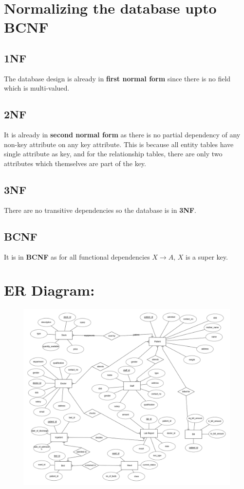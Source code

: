 \documentclass{article}
\begin{document}
\section{Normalizing the database upto BCNF}
\subsection{1NF} The database design is already in \textbf{first normal form} since there is no field which is multi-valued.
\subsection{2NF} It is already in \textbf{second normal form} as there is no partial dependency of any non-key attribute on any key attribute. This is because all entity tables have single attribute as key, and for the relationship tables, there are only two attributes which themselves are part of the key.
\subsection{3NF} 
There are no transitive dependencies so the database is in \textbf{3NF}.

\subsection{BCNF} 
It is in \textbf{BCNF} as for all functional dependencies $X \rightarrow A$, $X$ is a super key.

\section{ER Diagram:}
\begin{figure}[H]
    \vspace{0pt}
    \includegraphics[width=450pt, keepaspectratio]{ER-Diagram.png}
\end{figure}
\end{document}
